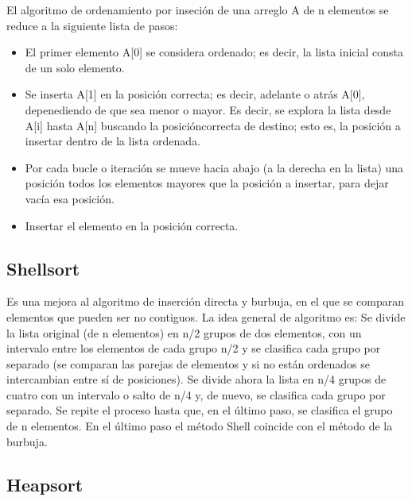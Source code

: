 \documentclass[12pt]{article}
\begin{document}
El algoritmo de ordenamiento por inseci\'on de una arreglo A de n elementos se reduce a la siguiente lista de pasos:
\begin{itemize}
\item {El primer elemento A[0] se considera ordenado; es decir, la lista inicial consta de un solo elemento.}
\item {Se inserta A[1] en la posici\'on correcta; es decir, adelante o atr\'as A[0], depenediendo de que sea menor o mayor. Es decir, se explora la lista desde A[i] hasta A[n] buscando la posici\'oncorrecta de destino; esto es, la posici\'on a insertar dentro de la lista ordenada.}
\item {Por cada bucle o iteraci\'on se mueve hacia abajo (a la derecha en la lista) una posici\'on todos los elementos mayores que la posici\'on a insertar, para dejar vac\'{i}a esa posici\'on.} 
\item {Insertar el elemento en la posici\'on correcta.}
\end{itemize}

\subsection{Shellsort}

Es una mejora al algoritmo de inserci\'on directa y burbuja, en el que se comparan elementos que pueden ser no contiguos. La idea general de algoritmo es:
Se divide la lista original (de n elementos) en n/2 grupos de dos elementos, con un intervalo entre los elementos de cada grupo n/2 y se clasifica cada grupo por separado (se comparan las parejas de elementos y si no están ordenados se intercambian entre s\'{i} de posiciones). Se divide ahora la lista en n/4 grupos de cuatro con un intervalo o salto de n/4 y, de nuevo, se clasifica cada grupo por separado. Se repite el proceso hasta que, en el \'ultimo paso, se clasifica el grupo de n elementos. En el \'ultimo paso el m\'etodo Shell coincide con el m\'etodo de la burbuja.

\subsection{Heapsort}
\end{document}

